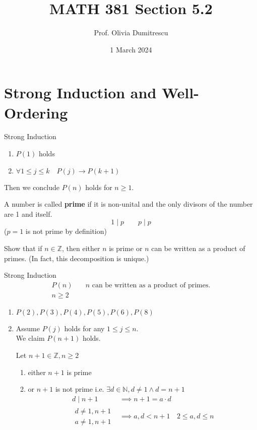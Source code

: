 \documentclass[letterpaper, 12pt]{article}
\title{MATH 381 Section 5.2}
\author{Prof. Olivia Dumitrescu}
\date{1 March 2024}
\newenvironment{proof}[1][Proof]{\begin{trivlist}
\item[\hskip \labelsep {\bfseries #1}]}{\end{trivlist}}
\newenvironment{definition}[1][Definition]{\begin{trivlist}
\item[\hskip \labelsep {\bfseries #1}]}{\end{trivlist}}
\newenvironment{example}[1][Example]{\begin{trivlist}
\item[\hskip \labelsep {\bfseries #1}]}{\end{trivlist}}
\newcommand{\keyword}[1]{\textbf{#1}}
\newcommand{\then}{\rightarrow}
\newcommand{\N}{\mathbb{N}}
\newcommand{\Z}{\mathbb{Z}}
\newcommand{\0}{\emptyset}
\begin{document}
    \maketitle
    \section*{Strong Induction and Well-Ordering}
    Strong Induction
    \begin{enumerate}
        \item $P(1)$ holds
        \item $\forall 1 \le j \le k \quad P(j) \then P(k + 1)$
    \end{enumerate}
    Then we conclude $P(n)$ holds for $n \ge 1$.
    \begin{definition}
        A number is called \keyword{prime} if it is non-unital and the only divisors of the 
        number are 1 and itself.
        \[1 \mid p \qquad p \mid p\]
        ($p = 1$ is not prime by definition)
    \end{definition}
    \begin{example}
        Show that if $n \in \Z$, then either $n$ is prime or $n$ can be written as a product 
        of primes. (In fact, this decomposition is unique.)
    \end{example}
    \begin{proof} Strong Induction
        \begin{align*}
            P(n) &\quad n \text{ can be written as a product of primes.} \\
            n \ge 2 &
        \end{align*}
        \begin{enumerate}
            \item $P(2), P(3), P(4), P(5), P(6), P(8)$
            \item Assume $P(j)$ holds for any $1 \le j \le n$. \\
            We claim $P(n+1)$ holds.
            \begin{flushleft}
                Let $n + 1 \in \Z, n \ge 2$
                \begin{enumerate}
                \item either $n + 1$ is prime
                \item or $n + 1$ is not prime i.e. $\exists d \in \N, d \ne 1 \wedge d = n + 1$
                \begin{align*}
                    d \mid n + 1 &\implies n + 1 = a \cdot d \\
                    \begin{aligned}
                        d \ne 1, n + 1 \\
                        a \ne 1, n + 1
                    \end{aligned} &\implies a, d < n + 1
                    & 2 \le a, d \le n
                \end{align*}
                \end{enumerate}
            \end{flushleft}
        \end{enumerate}
    \end{proof}
\end{document}
